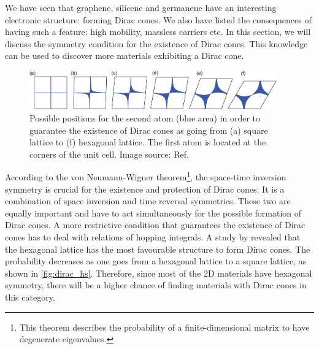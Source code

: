 We have seen that graphene, silicene and germanene have an interesting electronic structure: forming Dirac cones. We also have listed the consequences of having such a feature: high mobility, massless carriers etc. In this section, we will discuss the symmetry condition for the existence of Dirac cones. This knowledge can be used to discover more materials exhibiting a Dirac cone. 
\begin{figure}[htbp!] 
\centering  
\includegraphics[width=0.95\textwidth]{dirac_hs.png}
\caption[Possibility of the formation of Dirac cones in various lattice systems]{ Possible positions for the second atom (blue area) in order to guarantee the existence of Dirac cones as going from (a) square lattice to (f) hexagonal lattice. The first atom is located at the corners of the unit cell. Image source: Ref. \cite{Liu2013} }  
\label{fig:dirac_hs}
\end{figure} 
According to the von Neumann-Wigner theorem\footnote{This theorem describes the probability of a finite-dimensional matrix to have degenerate eigenvalues.}, the space-time inversion symmetry is crucial for the existence and protection of Dirac cones\cite{Wang2015b}. It is a combination of space inversion and time reversal symmetries. These two are equally important and have to act simultaneously for the possible formation of Dirac cones. A more restrictive condition that guarantees the existence of Dirac cones has to deal with relations of hopping integrals\cite{Hasegawa2006,Liu2013}. A study by \citet{Liu2013} revealed that the hexagonal lattice has the most favourable structure to form Dirac cones. The probability decreases as one goes from a hexagonal lattice to a square lattice, as shown in \autoref{fig:dirac_hs}. Therefore, since most of the 2D materials have hexagonal symmetry, there will be a higher chance of finding materials with Dirac cones in this category.

